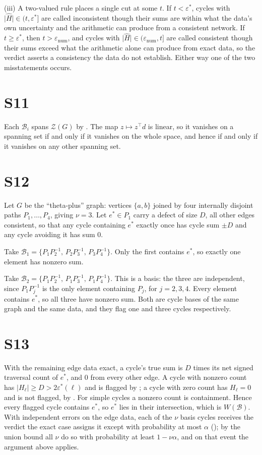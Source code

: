 \documentclass[11pt,a4paper]{article}
\theoremstyle{definition}
\theoremstyle{remark}
\newcommand{\abs}[1]{\lvert#1\rvert}
\newcommand{\eps}{\varepsilon}
\newcommand{\epsnum}{\eps_{\mathrm{num}}}
\newcommand{\epsstar}{\eps^{\ast}}
\newcommand{\hol}{H}
\begin{document}
(iii) A two-valued rule places a single cut at some $t$. If
$t<\epsstar$, cycles with $\abs{\widehat{\hol}}\in(t,\epsstar]$ are
called inconsistent though their sums are within what the data's own
uncertainty and the arithmetic can produce from a consistent network. If
$t\ge\epsstar$, then $t>\epsnum$, and cycles with
$\abs{\widehat{\hol}}\in(\epsnum,t]$ are called consistent though their
sums exceed what the arithmetic alone can produce from exact data, so
the verdict asserts a consistency the data do not establish. Either way
one of the two misstatements occurs.

\section*{S11}
Each $\mathcal{B}_i$ spans $\mathcal{Z}(G)$ by .
The map $z\mapsto z^{\top}d$ is linear, so it vanishes on a spanning set
if and only if it vanishes on the whole space, and hence if and only if
it vanishes on any other spanning set.

\section*{S12}
Let $G$ be the ``theta-plus'' graph: vertices $\{a,b\}$ joined by four
internally disjoint paths $P_1,\dots,P_4$, giving
$\nu = 3$. Let $e^{\ast}\in P_1$ carry a defect of size $D$, all other
edges consistent, so that any cycle containing $e^{\ast}$ exactly once
has cycle sum $\pm D$ and any cycle avoiding it has sum $0$.

Take $\mathcal{B}_1 = \{P_1P_2^{-1},\,P_2P_3^{-1},\,P_3P_4^{-1}\}$.
Only the first contains $e^{\ast}$, so exactly one element has nonzero
sum.

Take $\mathcal{B}_2 = \{P_1P_2^{-1},\,P_1P_3^{-1},\,P_1P_4^{-1}\}$.
This is a basis: the three are independent, since $P_1P_j^{-1}$ is the
only element containing $P_j$, for $j=2,3,4$. Every element
contains $e^{\ast}$, so all three have nonzero sum. Both are cycle bases
of the same graph and the same data, and they flag one and three cycles
respectively.

\section*{S13}
With the remaining edge data exact, a cycle's true sum is $D$ times its
net signed traversal count of $e^{\ast}$, and $0$ from every other edge.
A cycle with nonzero count has $\abs{\hol_\ell}\ge D>2\epsstar(\ell)$
and is flagged by ; a cycle with zero count has
$\hol_\ell=0$ and is not flagged, by . For
simple cycles a nonzero count is containment. Hence every flagged cycle
contains $e^{\ast}$, so $e^{\ast}$ lies in their intersection, which is
$W(\mathcal{B})$. With independent errors on the edge data, each of the
$\nu$ basis cycles receives the verdict the exact case assigns it except
with probability at most $\alpha$ (); by the union bound all $\nu$ do so with probability at
least $1-\nu\alpha$, and on that event the argument above applies.
\end{document}
